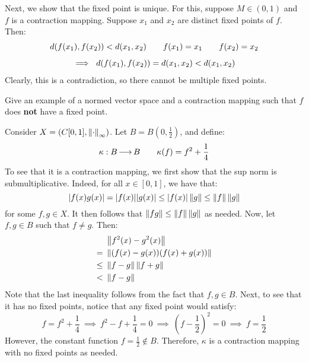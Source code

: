 \begin{soln}[title=Uniqueness]
    Next, we show that the fixed point is unique.
    For this, suppose $ M \in (0, 1) $ and $ f $ is a contraction mapping. \vsp
    Suppose $ x_{1} $ and $ x_{2} $ are distinct fixed points of $ f $. Then:
    \begin{gather*}
        d(f(x_{1}), f(x_{2})) < d(x_{1}, x_{2}) \qquad
        f(x_{1}) = x_{1} \qquad
        f(x_{2}) = x_{2} \vsp
        \implies \ d(f(x_{1}), f(x_{2})) = d(x_{1}, x_{2}) < d(x_{1}, x_{2})
    \end{gather*}
    Clearly, this is a contradiction, so there cannot be multiple fixed points.
\end{soln}

\newpage
\begin{qu}[num=11.2]
    Give an example of a normed vector space and a contraction mapping such that
    $ f $ does \textbf{not} have a fixed point.
\end{qu}

\begin{soln}
    Consider $ X = (C[0,1], \left\|\cdot\right\|_{\infty}) $.
    Let $ B = B \left( 0, \frac{1}{2} \right) $, and define:
    \begin{equation*}
        \kappa: B \operatorname{\longrightarrow} B \qquad \kappa(f) = f^{2} + \frac{1}{4}
    \end{equation*}
    To see that it is a contraction mapping, we first show that the sup norm is
    submultiplicative. Indeed, for all $ x \in [0,1] $, we have that:
    \begin{equation*}
        \abs{f(x)g(x)} = \abs{f(x)}\abs{g(x)} \leq \abs{f(x)}\left\|g\right\| \leq
        \left\|f\right\|\left\|g\right\|
    \end{equation*}
    for some $ f, g \in X $.
    It then follows that $ \left\|fg\right\| \leq \left\|f\right\|\left\|g\right\| $ as needed.
    Now, let $ f, g \in B $ such that $ f \neq g $. Then:
    \begin{align*}
        &  \left\|f^{2}(x) - g^{2}(x)\right\| \\
        = \ & \left\|(f(x) - g(x))(f(x) + g(x))\right\| \\
        \leq \ & \left\|f - g\right\| \left\|f + g\right\| \\
        < \ & \left\|f - g\right\|
    \end{align*}
    Note that the last inequality follows from the fact that $ f, g \in B $.
    Next, to see that it has no fixed points, notice that any fixed point would
    satisfy:
    \begin{equation*}
        f = f^{2} + \frac{1}{4}
        \ \implies \ f^{2} - f + \frac{1}{4} = 0
        \ \implies \ \left( f - \frac{1}{2} \right)^{2} = 0
        \ \implies \ f = \frac{1}{2}
    \end{equation*}
    However, the constant function $ f = \frac{1}{2} \notin B $.
    Therefore, $ \kappa $ is a contraction mapping with no fixed points
    as needed.
\end{soln}


